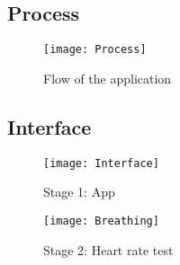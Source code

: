 \subsection{Process}
\begin{figure}[H]
	\centering
	\texttt{[image: Process]}
	\caption{Flow of the application}
\end{figure}


\subsection{Interface}
\begin{figure}[H]
	\centering
	\texttt{[image: Interface]}
	\caption{Stage 1: App}
\end{figure}

\begin{figure}[H]
	\centering
	\texttt{[image: Breathing]}
	\caption{Stage 2: Heart rate test}
\end{figure}